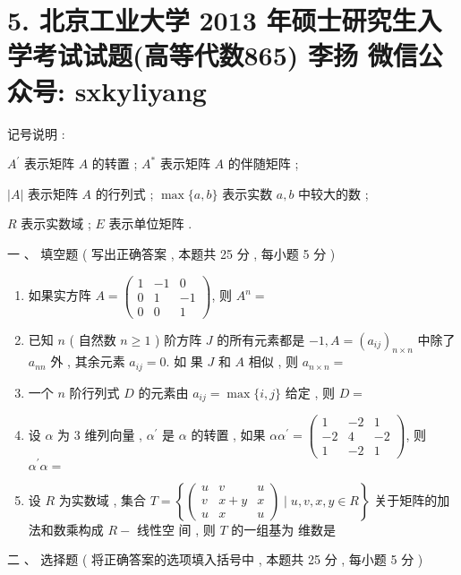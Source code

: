 \documentclass[10pt]{article}
\begin{document}
{\section{5. 北京工业大学 2013 年硕士研究生入学考试试题(高等代数865) 
 李扬 
 微信公众号: sxkyliyang}
 记号说明 :

$A^{\prime}$  表示矩阵  $A$  的转置 ; $A^{*}$  表示矩阵  $A$  的伴随矩阵 ;

$|A|$  表示矩阵  $A$  的行列式 ; $\max \{a, b\}$  表示实数  $a, b$  中较大的数 ;

$R$  表示实数域 ; $E$  表示单位矩阵 .

 一 、 填空题 ( 写出正确答案 ,  本题共  25  分 , 每小题  5  分 )

\begin{enumerate}
  \item  如果实方阵  $A=\left(\begin{array}{ccc}1 & -1 & 0 \\ 0 & 1 & -1 \\ 0 & 0 & 1\end{array}\right)$,  则  $A^{n}=$

  \item  已知  $n$ ( 自然数  $n \geq 1$ )  阶方阵  $J$  的所有元素都是  $-1, A=\left(a_{i j}\right)_{n \times n}$  中除了  $a_{n n}$  外 ,  其余元素  $a_{i j}=0$.  如   果  $J$  和  $A$  相似 ,  则  $a_{n \times n}=$

  \item  一个  $n$  阶行列式  $D$  的元素由  $a_{i j}=\max \{i, j\}$  给定 ,  则  $D=$

  \item  设  $\alpha$  为  3  维列向量 , $\alpha^{\prime}$  是  $\alpha$  的转置 ,  如果  $\alpha \alpha^{\prime}=\left(\begin{array}{ccc}1 & -2 & 1 \\ -2 & 4 & -2 \\ 1 & -2 & 1\end{array}\right)$,  则  $\alpha^{\prime} \alpha=$

  \item  设  $R$  为实数域 ,  集合  $T=\left\{\left(\begin{array}{ccc}u & v & u \\ v & x+y & x \\ u & x & u\end{array}\right) \mid u, v, x, y \in R\right\}$  关于矩阵的加法和数乘构成  $R-$  线性空   间 ,  则  $T$  的一组基为   维数是 

\end{enumerate}
 二 、 选择题 ( 将正确答案的选项填入括号中 ,  本题共  25  分 ,  每小题  5  分 )

}
\end{document}
